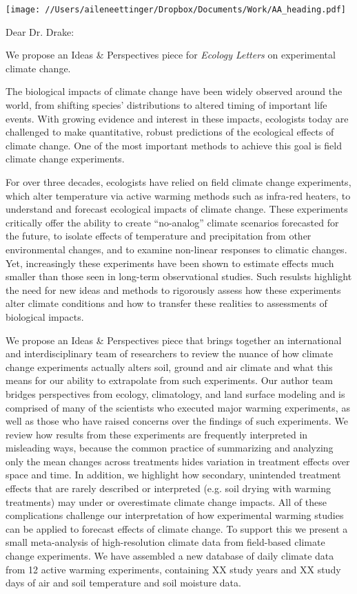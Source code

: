 \documentclass[12pt,a4paper]{letter}
\begin{document}
\begin{letter}{}
\texttt{[image: //Users/aileneettinger/Dropbox/Documents/Work/AA\_heading.pdf]}

\opening{Dear Dr. Drake:}
We propose an Ideas \& Perspectives piece for \emph{Ecology Letters} on experimental climate change. 

The biological impacts of climate change have been widely observed around the world, from shifting species' distributions to altered timing of important life events. With growing evidence and interest in these impacts, ecologists today are challenged to make quantitative, robust predictions of the ecological effects of climate change. One of the most important methods to achieve this goal is field climate change experiments.

For over three decades, ecologists have relied on field climate change experiments, which alter temperature via active warming methods such as infra-red heaters, to understand and forecast ecological impacts of climate change.  These experiments critically offer the ability to create ``no-analog'' climate scenarios forecasted for the future, to isolate effects of temperature and precipitation from other environmental changes, and to examine non-linear responses to climatic changes. Yet, increasingly these experiments have been shown to estimate effects much smaller than those seen in long-term observational studies. Such resulsts highlight the need for new ideas and methods to rigorously assess how these experiments alter climate conditions and how to transfer these realities to assessments of biological impacts. %

We propose an Ideas \& Perspectives piece that  brings together an international and interdisciplinary team of researchers to review the nuance of how climate change experiments actually alters soil, ground and air climate and what this means for our ability to extrapolate from such experiments. Our author team bridges perspectives from ecology, climatology, and land surface modeling and is comprised of many of the scientists who executed major warming experiments, as well as those who have raised concerns over the findings of such experiments. We review how results from these experiments are frequently interpreted in misleading ways, because the common practice of summarizing and analyzing only the mean changes across treatments hides variation in treatment effects over space and time. In addition, we highlight how secondary, unintended treatment effects that are rarely described or interpreted (e.g. soil drying with warming treatments) may under or overestimate climate change impacts. All of these complications challenge our interpretation of how experimental warming studies can be applied to forecast effects of climate change. To support this we present a small meta-analysis of high-resolution climate data from field-based climate change experiments. We have assembled a new database of daily climate data from 12 active warming experiments, containing XX study years and XX study days of air and soil temperature and soil moisture data. 


\end{letter}
\end{document}
